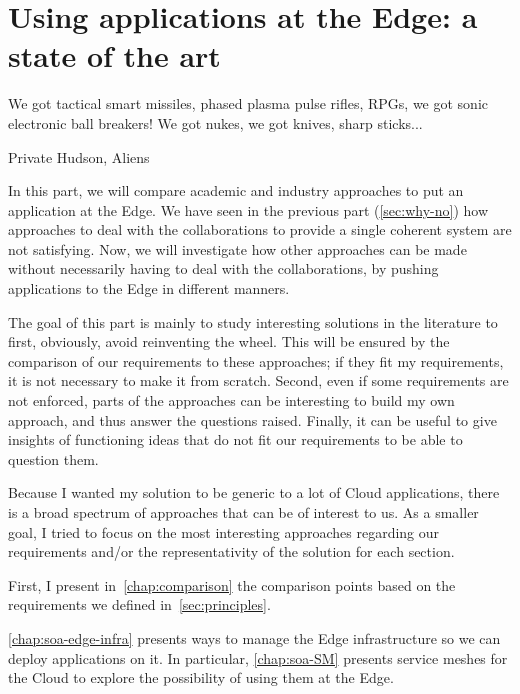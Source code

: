 
\part[State of the Art]{Using applications at the Edge: a state of the art}
\label{p:soa}

\epigraph{We got tactical smart missiles, phased plasma pulse rifles, RPGs, we got sonic electronic ball breakers! We got nukes, we got knives, sharp sticks...}{Private Hudson, Aliens}

In this part, we will compare academic and industry approaches
to put an application at the Edge.
%
We have seen in the previous part (\autoref{sec:why-no}) how
approaches to deal with the collaborations to provide a single
coherent system are not satisfying.
%
Now, we will investigate how other approaches can be made without
necessarily having to deal with the collaborations, by pushing
applications to the Edge in different manners.

The goal of this part is mainly to study interesting solutions in the
literature to first, obviously, avoid reinventing the wheel.
%
This will be ensured by the comparison of our requirements to these
approaches; if they fit my requirements, it is not necessary to make
it from scratch.
%
Second, even if some requirements are not enforced, parts of the
approaches can be interesting to build my own approach, and thus
answer the questions raised.
%
Finally, it can be useful to give insights of functioning ideas that
do not fit our requirements to be able to question them.


Because I wanted my solution to be generic to a lot of Cloud
applications, there is a broad spectrum of approaches that can be of
interest to us.
%
As a smaller goal, I tried to focus on the most interesting approaches
regarding our requirements and/or the representativity of the solution
for each section.

First, I present in~\autoref{chap:comparison} the comparison points
based on the requirements we defined in~\autoref{sec:principles}.
%

%
\autoref{chap:soa-edge-infra} presents ways to manage the Edge
infrastructure so we can deploy applications on it.
%
In particular, \autoref{chap:soa-SM} presents service meshes for the
Cloud to explore the possibility of using them at the Edge.
%

